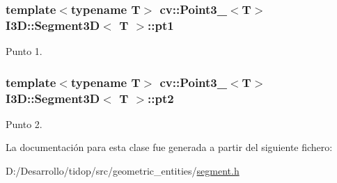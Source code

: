 \subsubsection[{\texorpdfstring{pt1}{pt1}}]{\setlength{\rightskip}{0pt plus 5cm}template$<$typename T$>$ cv\+::\+Point3\+\_\+$<$T$>$ {\bf I3\+D\+::\+Segment3D}$<$ T $>$\+::pt1}\hypertarget{class_i3_d_1_1_segment3_d_af9ee76f2e2b78d61ef8ea044bb47fe21}{}\label{class_i3_d_1_1_segment3_d_af9ee76f2e2b78d61ef8ea044bb47fe21}


Punto 1. 

\subsubsection[{\texorpdfstring{pt2}{pt2}}]{\setlength{\rightskip}{0pt plus 5cm}template$<$typename T$>$ cv\+::\+Point3\+\_\+$<$T$>$ {\bf I3\+D\+::\+Segment3D}$<$ T $>$\+::pt2}\hypertarget{class_i3_d_1_1_segment3_d_a91b9feb55271c1b1cbe6be0254904e21}{}\label{class_i3_d_1_1_segment3_d_a91b9feb55271c1b1cbe6be0254904e21}


Punto 2. 



La documentación para esta clase fue generada a partir del siguiente fichero\+:\begin{DoxyCompactItemize}
\item 
D\+:/\+Desarrollo/tidop/src/geometric\+\_\+entities/\hyperlink{segment_8h}{segment.\+h}\end{DoxyCompactItemize}
